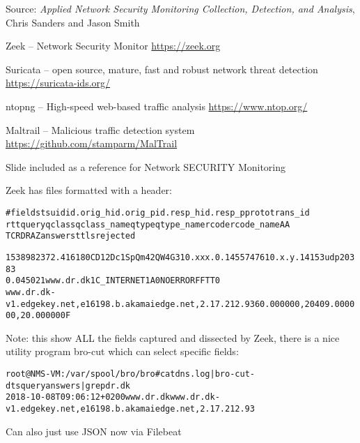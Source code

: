 \documentclass[Screen16to9,17pt]{foils}
\begin{document}
Source: \emph{Applied Network Security Monitoring Collection, Detection, and Analysis}, Chris Sanders and Jason Smith





\begin{list1}
\item Zeek -- Network Security Monitor {\footnotesize\url{https://zeek.org}}
\item Suricata -- open source, mature, fast and robust network threat detection {\footnotesize\url{https://suricata-ids.org/}}
\item ntopng -- High-speed web-based traffic analysis  {\footnotesize\url{https://www.ntop.org/}}
\item Maltrail -- Malicious traffic detection system {\footnotesize\url{https://github.com/stamparm/MalTrail}}
\end{list1}

Slide included as a reference for Network SECURITY Monitoring



Zeek has files formatted with a header:
\begin{alltt}\footnotesize
#fields ts      uid     id.orig_h       id.orig_p       id.resp_h       id.resp_p       proto   trans_id
        rtt     query   qclass  qclass_name     qtype   qtype_name      rcode   rcode_name      AA
        TC      RD      RA      Z       answers ttls    rejected

1538982372.416180	CD12Dc1SpQm42QW4G3	10.xxx.0.145	57476	10.x.y.141	53	udp	20383
	0.045021	www.dr.dk	1	C_INTERNET	1	A	0	NOERROR	F	F	T	T	0
   www.dr.dk-v1.edgekey.net,e16198.b.akamaiedge.net,2.17.212.93	60.000000,20409.000000,20.000000	F
\end{alltt}

Note: this show ALL the fields captured and dissected by Zeek, there is a nice utility program bro-cut which can select specific fields:

\begin{alltt}\small
root@NMS-VM:/var/spool/bro/bro# cat dns.log | bro-cut -d ts query answers | grep dr.dk
2018-10-08T09:06:12+0200	www.dr.dk	www.dr.dk-v1.edgekey.net,e16198.b.akamaiedge.net,2.17.212.93
\end{alltt}

Can also just use JSON now via Filebeat
\end{document}
